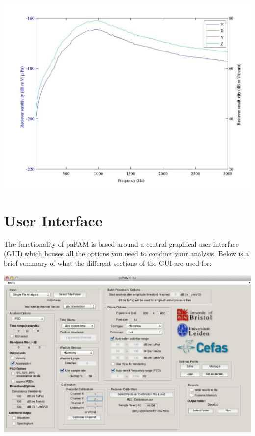 \documentclass[11pt]{report}
\begin{document}
\begin{center}
\includegraphics[width = \textwidth ]{12.jpeg}
\end{center}

\section{User Interface}

The functionality of paPAM is based around a central graphical user interface (GUI) which houses all the options you need to conduct your analysis.  Below is a brief summary of what the different sections of the GUI are used for:\\

\begin{center}
\includegraphics[width = \textwidth ]{3.png}
\end{center}
\end{document}
